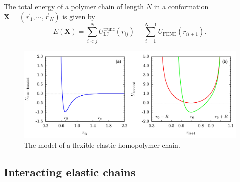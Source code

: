 \documentclass[12pt]{report}
\begin{document}
The total energy of a polymer chain of length $N$ in a conformation
$\mathbf{X} = (\vec{r}_1,\cdots,\vec{r}_{N})$ is given by
\begin{equation}
E(\mathbf{X}) = \sum^{N}_{i<j}
U_{\mathrm{LJ}}^{\mathrm{trunc}}(r_{ij}) + \sum^{N-1}_{i=1} 	
U_{\mathrm{FENE}}(r_{ii+1}). 
\label{totalE}
\end{equation}

%
\begin{figure}
\center
\includegraphics[width = 1.01\textwidth]{chapter4Figs/potentialLarge.pdf}
\caption{\label{fig:potentials}%
The model of a flexible elastic homopolymer chain.
}
\end{figure}
% 

\subsection{Interacting elastic chains}
\end{document}
